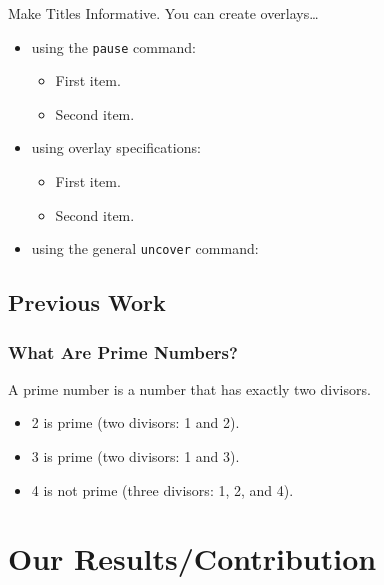 \documentclass[aspectratio=169]{beamer}
\begin{document}
{\begin{frame}{Make Titles Informative.}
  You can create overlays\dots
  \begin{itemize}
  \item using the \texttt{pause} command:
    \begin{itemize}
    \item
      First item.
      \pause
    \item    
      Second item.
    \end{itemize}
  \item
    using overlay specifications:
    \begin{itemize}
    \item<3->
      First item.
    \item<4->
      Second item.
    \end{itemize}
  \item
    using the general \texttt{uncover} command:
    \begin{itemize}
    \end{itemize}
  \end{itemize}
\end{frame}


\subsection{Previous Work}
\begin{frame}
  \frametitle{What Are Prime Numbers?}
  \begin{definition}
    A \alert{prime number} is a number that has exactly two divisors.
  \end{definition}
\pause
	\begin{example}
		\begin{itemize}
			\item 2 is prime (two divisors: 1 and 2).
\pause
			\item 3 is prime (two divisors: 1 and 3).
\pause
			\item 4 is not prime (\alert{three} divisors: 1, 2, and 4).
		\end{itemize}
	\end{example}
\end{frame}



\section{Our Results/Contribution}

}
\end{document}
